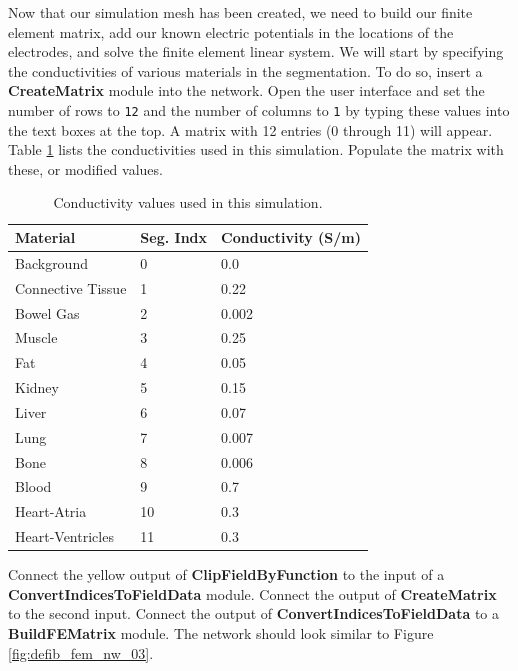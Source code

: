 \documentclass[fleqn,11pt,openany]{book}
\begin{document}
Now that our simulation mesh has been created, we need to build our
finite element matrix, add our known electric potentials in the
locations of the electrodes, and solve the finite element linear
system. We will start by specifying the conductivities of various
materials in the segmentation. To do so, insert a {\bf CreateMatrix}
module into the network. Open the user interface and set the number of
rows to {\tt 12} and the number of columns to {\tt 1} by typing these
values into the text boxes at the top. A matrix with 12 entries (0
through 11) will appear. Table \ref{tbl:conductivities} lists the
conductivities used in this simulation. Populate the matrix with
these, or modified values.

\begin{table}[h]
\begin{tabular}{|l|l|l|}
\hline
{\bf Material} & {\bf Seg. Indx} & {\bf Conductivity (S/m)} \\
\hline \hline
Background & 0 & 0.0\\ \hline
Connective Tissue & 1 & 0.22\\ \hline
Bowel Gas & 2 & 0.002\\ \hline
Muscle & 3 & 0.25\\ \hline
Fat & 4 & 0.05\\ \hline
Kidney & 5 & 0.15\\ \hline
Liver & 6 & 0.07\\ \hline
Lung & 7 & 0.007\\ \hline
Bone & 8 & 0.006\\ \hline
Blood & 9 & 0.7\\ \hline
Heart-Atria & 10 & 0.3\\ \hline
Heart-Ventricles & 11 & 0.3\\ \hline
\end{tabular}
\caption{Conductivity values used in this simulation.} \label{tbl:conductivities}
\end{table}

Connect the yellow output of {\bf ClipFieldByFunction} to the input of
a {\bf ConvertIndicesToFieldData} module. Connect the output of {\bf
CreateMatrix} to the second input. Connect the output of {\bf
ConvertIndicesToFieldData} to a {\bf BuildFEMatrix} module. The
network should look similar to Figure \ref{fig:defib_fem_nw_03}.
\end{document}
